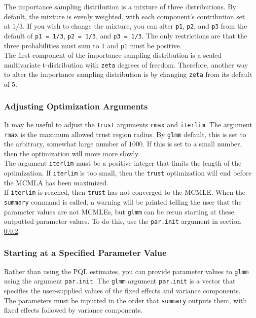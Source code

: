 \documentclass[11pt]{article}\usepackage[]{graphicx}\usepackage[]{color}
\begin{document}
The importance sampling distribution is a mixture of three distributions. By default, the mixture is evenly weighted, with each component's contribution set at $1/3$. If you wish to change the mixture, you can alter \texttt{p1}, \texttt{p2}, and \texttt{p3} from the default of  \texttt{p1 = 1/3}, \texttt{p2 = 1/3}, and \texttt{p3 = 1/3}. The only restrictions are that the three probabilities must sum to $1$ and \texttt{p1} must be positive.\\

 The first component of the importance sampling distribution is a scaled multivariate t-distribution with \texttt{zeta} degrees of freedom. Therefore, another way to alter the importance sampling distribution is by changing \texttt{zeta} from its default of $5$.\\

\subsubsection{Adjusting Optimization Arguments}
It may be useful to adjust the \texttt{trust} arguments \texttt{rmax} and \texttt{iterlim}. The argument \texttt{rmax} is the maximum allowed trust region radius. By \texttt{glmm} default, this is set to the arbitrary, somewhat large number of $1000$. If this is set to a small number, then the optimization will move more slowly.\\

The argument \texttt{iterlim} must be a positive integer that limits the length of the optimization. If \texttt{iterlim} is too small, then the \texttt{trust} optimization will end before the MCMLA has been maximized.\\

If \texttt{iterlim} is reached, then \texttt{trust} has not converged to the MCMLE. When the \texttt{summary} command is called, a warning will be printed telling the user that the parameter values are not MCMLEs, but \texttt{glmm} can be rerun starting at these  outputted parameter values. To do this, use the \texttt{par.init} argument in section \ref{sec:parinit}. \\

\subsubsection{Starting at a Specified Parameter Value}\label{sec:parinit}
Rather than using the PQL estimates, you can provide parameter values to \texttt{glmm} using the argument \texttt{par.init}. The \texttt{glmm} argument \texttt{par.init} is a vector that specifies the user-supplied values of the fixed effects and variance components. The parameters must be inputted in the order that \texttt{summary} outputs them, with fixed effects followed by variance components.\\
\end{document}
